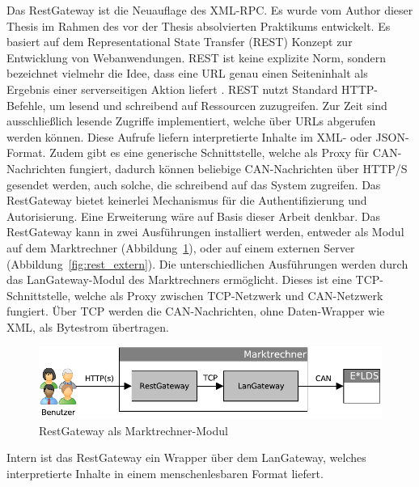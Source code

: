 \documentclass[11pt,a4paper]{report}
\begin{document}
Das RestGateway ist die Neuauflage des XML-RPC. Es wurde vom Author dieser Thesis im Rahmen des vor der Thesis absolvierten Praktikums entwickelt. Es basiert auf dem Representational State Transfer (REST) Konzept zur Entwicklung von Webanwendungen. REST ist keine explizite Norm, sondern bezeichnet vielmehr die Idee, dass eine URL genau einen Seiteninhalt als Ergebnis einer serverseitigen Aktion liefert \cite{wiki_rest}. REST nutzt Standard HTTP-Befehle, um lesend und schreibend auf Ressourcen zuzugreifen. Zur Zeit sind ausschließlich lesende Zugriffe implementiert, welche über URLs abgerufen werden können. Diese Aufrufe liefern interpretierte Inhalte im XML- oder JSON-Format. Zudem gibt es eine generische Schnittstelle, welche als Proxy für CAN-Nachrichten fungiert, dadurch können beliebige CAN-Nachrichten über HTTP/S gesendet werden, auch solche, die schreibend auf das System zugreifen. Das RestGateway bietet keinerlei Mechanismus für die Authentifizierung und Autorisierung. Eine Erweiterung wäre auf Basis dieser Arbeit denkbar. Das RestGateway kann in zwei Ausführungen installiert werden, entweder als Modul auf dem Marktrechner (Abbildung~\ref{fig:rest_intern}), oder auf einem externen Server (Abbildung~\ref{fig:rest_extern}). Die unterschiedlichen Ausführungen werden durch das LanGateway-Modul des Marktrechners ermöglicht. Dieses ist eine TCP-Schnittstelle, welche als Proxy zwischen TCP-Netzwerk und CAN-Netzwerk fungiert. Über TCP werden die CAN-Nachrichten, ohne Daten-Wrapper wie XML, als Bytestrom übertragen.

\begin{figure}[htbp]
\centering
\includegraphics[scale=0.7]{images/RestGateway_intern.pdf}
\caption[]{RestGateway als Marktrechner-Modul}
\label{fig:rest_intern}
\end{figure}

Intern ist das RestGateway ein Wrapper über dem LanGateway, welches interpretierte Inhalte in einem menschenlesbaren Format liefert.
\end{document}
